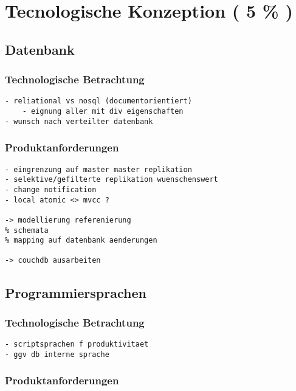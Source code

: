 \chapter{Tecnologische Konzeption ( 5 \% )}





\section{Datenbank}
\subsection{Technologische Betrachtung}

\begin{verbatim}
- reliational vs nosql (documentorientiert)
    - eignung aller mit div eigenschaften
- wunsch nach verteilter datenbank
\end{verbatim}

\subsection{Produktanforderungen}

\begin{verbatim}
- eingrenzung auf master master replikation
- selektive/gefilterte replikation wuenschenswert
- change notification
- local atomic <> mvcc ?

-> modellierung referenierung
% schemata
% mapping auf datenbank aenderungen

-> couchdb ausarbeiten

\end{verbatim}


\section{Programmiersprachen}
\subsection{Technologische Betrachtung}

\begin{verbatim}
- scriptsprachen f produktivitaet
- ggv db interne sprache
\end{verbatim}

\subsection{Produktanforderungen}

